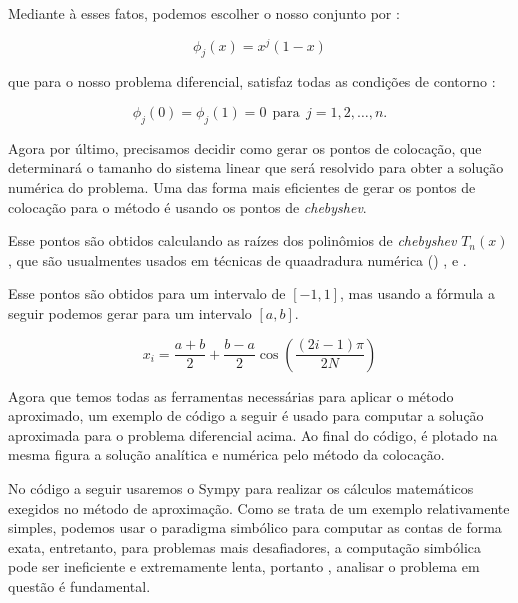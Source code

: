 \documentclass[a4paper, 12pt]{article}
\numberwithin{equation}{section}
\begin{document}
Mediante à esses fatos, podemos escolher o nosso conjunto por : 

\begin{equation*}
    \phi_j(x) = x^{j}(1 - x)
\end{equation*}

que para o nosso problema diferencial, satisfaz todas as condições de contorno : 

\begin{equation*}
    \phi_j(0) =  \phi_j(1) = 0 \ \ \textrm{para} \ \ j = 1,2,\ldots,n.    
\end{equation*}












Agora por último, precisamos decidir como gerar os pontos de colocação, que determinará o tamanho do sistema linear que será resolvido para obter a solução numérica do problema. Uma das forma mais eficientes de gerar os pontos de colocação para o método é usando os pontos de \textit{chebyshev}. 

Esse pontos são obtidos calculando as raízes dos polinômios de \textit{chebyshev} $T_n(x)$, que são usualmentes usados em técnicas de quaadradura numérica (\citep{press2007numerical}) , \citep{chapra2011numerical} e \citep{nakamura1990applied}. 

Esse pontos são obtidos para um intervalo de $[-1,1]$, mas usando a fórmula a seguir podemos gerar para um intervalo $[a,b]$. 

\begin{equation}
    x_i = \dfrac{a + b}{2 } + \dfrac{b - a}{2}\cos\left(\dfrac{\left(2i - 1\right)\pi}{2N}\right)
\end{equation}
 
Agora que temos todas as ferramentas necessárias para aplicar o método aproximado, um exemplo de código a
 seguir é usado para computar a solução aproximada para o problema diferencial acima. 
 Ao final do código, é plotado na mesma figura a solução analítica e numérica pelo 
 método da colocação.
 
 No código a seguir usaremos o Sympy para realizar os cálculos matemáticos exegidos no método 
 de aproximação. Como se trata de um exemplo relativamente simples, podemos usar o paradigma simbólico 
 para computar as contas de forma exata, entretanto, para problemas mais desafiadores, a computação 
 simbólica pode ser ineficiente e extremamente lenta, portanto , analisar o problema em questão 
 é fundamental.
\end{document}
